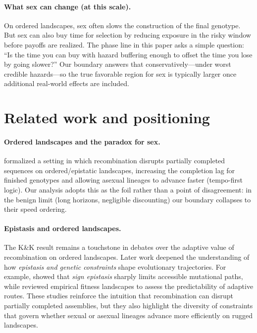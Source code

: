 \documentclass[11pt]{article}
\theoremstyle{upright}
\begin{document}
\paragraph{What sex can change (at this scale).}
On ordered landscapes, sex often slows the construction of the final genotype. But sex can also buy time for selection by reducing exposure in the risky window before payoffs are realized. The phase line in this paper asks a simple question: “Is the time you can buy with hazard buffering enough to offset the time you lose by going slower?” Our boundary answers that conservatively—under worst credible hazards—so the true favorable region for sex is typically larger once additional real-world effects are included.

\section{Related work and positioning}\label{sec:related}

\paragraph{Ordered landscapes and the paradox for sex.}
\citet{Kondrashov2001} formalized a setting in which recombination disrupts partially completed sequences on ordered/epistatic landscapes, increasing the completion lag for finished genotypes and allowing asexual lineages to advance faster (tempo-first logic). Our analysis adopts this as the foil rather than a point of disagreement: in the benign limit (long horizons, negligible discounting) our boundary collapses to their speed ordering.

\paragraph{Epistasis and ordered landscapes.}
The K\&K result remains a touchstone in debates over the adaptive value of recombination on ordered landscapes. Later work deepened the understanding of how \emph{epistasis and genetic constraints} shape evolutionary trajectories. For example, \citet{Weinreich2005} showed that \emph{sign epistasis} sharply limits accessible mutational paths, while \citet{deVisser2014} reviewed empirical fitness landscapes to assess the predictability of adaptive routes. These studies reinforce the intuition that recombination can disrupt partially completed assemblies, but they also highlight the diversity of constraints that govern whether sexual or asexual lineages advance more efficiently on rugged landscapes.
\end{document}
